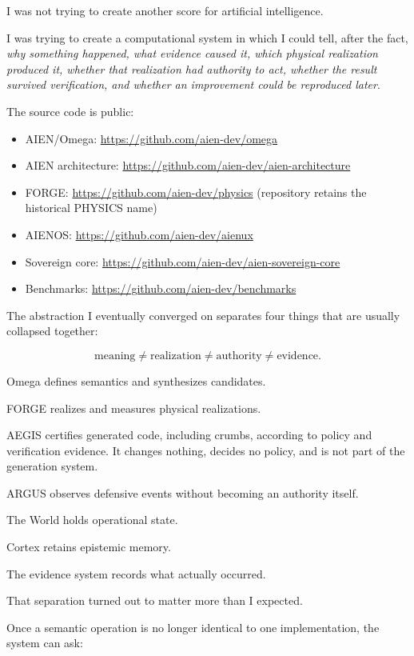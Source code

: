 \documentclass[11pt]{article}
\begin{document}
I was not trying to create another score for artificial intelligence.

I was trying to create a computational system in which I could tell, after the fact, \emph{why something happened, what evidence caused it, which physical realization produced it, whether that realization had authority to act, whether the result survived verification, and whether an improvement could be reproduced later}.

The source code is public:

\begin{itemize}
    \item AIEN/Omega: \url{https://github.com/aien-dev/omega}
    \item AIEN architecture: \url{https://github.com/aien-dev/aien-architecture}
    \item FORGE: \url{https://github.com/aien-dev/physics} (repository retains the historical PHYSICS name)
    \item AIENOS: \url{https://github.com/aien-dev/aienux}
    \item Sovereign core: \url{https://github.com/aien-dev/aien-sovereign-core}
    \item Benchmarks: \url{https://github.com/aien-dev/benchmarks}
\end{itemize}

The abstraction I eventually converged on separates four things that are usually collapsed together:

\[
\text{meaning}
\neq
\text{realization}
\neq
\text{authority}
\neq
\text{evidence}.
\]

Omega defines semantics and synthesizes candidates.

FORGE realizes and measures physical realizations.

AEGIS certifies generated code, including crumbs, according to policy and verification evidence. It changes nothing, decides no policy, and is not part of the generation system.

ARGUS observes defensive events without becoming an authority itself.

The World holds operational state.

Cortex retains epistemic memory.

The evidence system records what actually occurred.

That separation turned out to matter more than I expected.

Once a semantic operation is no longer identical to one implementation, the system can ask:
\end{document}
